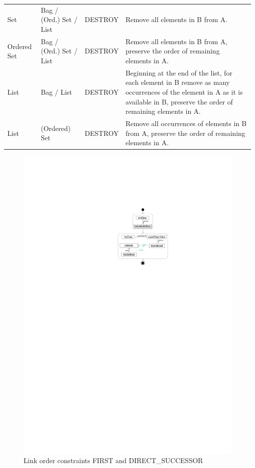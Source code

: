 \begin{table}[htbp]
\begin{tabular}{|l|l|c|p{4.6cm}|}
    Set & Bag / (Ord.) Set / List & DESTROY & Remove all elements in B from A.\\
    Ordered Set & Bag / (Ord.) Set / List & DESTROY & Remove all elements in B from A, preserve the order of remaining elements in A.\\
    List & Bag / List & DESTROY & Beginning at the end of the list, for each element in B remove as many occurrences of the element in A as it is available in B, preserve the order of remaining elements in A.\\
    List & (Ordered) Set & DESTROY & Remove all occurrences of elements in B from A, preserve the order of remaining elements in A.\\
    \hline
    \end{tabular}
\end{table}

\begin{figure}[htb]
  \centering
  \includegraphics[scale=.8]{figures/LinkConstraints1}
  \caption{Link order constraints FIRST and DIRECT\_SUCCESSOR}
  \label{fig:linkConstraints}
\end{figure}

